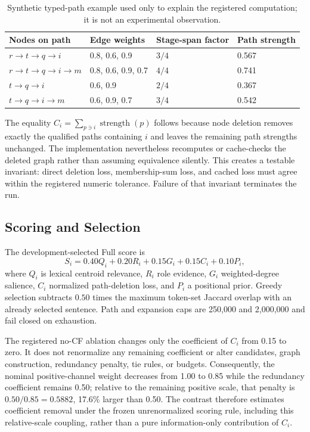 \documentclass[applsci,article,submit,moreauthors]{Definitions/mdpi}
\begin{document}
\begin{table}[H]
\caption{Synthetic typed-path example used only to explain the registered computation; it is not an experimental observation.}
\label{tab:toy-path}\centering\small
\begin{tabular}{llll}
\toprule
Nodes on path & Edge weights & Stage-span factor & Path strength\\
\midrule
$r\rightarrow t\rightarrow q\rightarrow i$ & 0.8, 0.6, 0.9 & $3/4$ & 0.567\\
$r\rightarrow t\rightarrow q\rightarrow i\rightarrow m$ & 0.8, 0.6, 0.9, 0.7 & $4/4$ & 0.741\\
$t\rightarrow q\rightarrow i$ & 0.6, 0.9 & $2/4$ & 0.367\\
$t\rightarrow q\rightarrow i\rightarrow m$ & 0.6, 0.9, 0.7 & $3/4$ & 0.542\\
\bottomrule
\end{tabular}
\end{table}

The equality $C_i=\sum_{p\ni i}\operatorname{strength}(p)$ follows because node deletion removes exactly the qualified paths containing $i$ and leaves the remaining path strengths unchanged. The implementation nevertheless recomputes or cache-checks the deleted graph rather than assuming equivalence silently. This creates a testable invariant: direct deletion loss, membership-sum loss, and cached loss must agree within the registered numeric tolerance. Failure of that invariant terminates the run.

\subsection{Scoring and Selection}

The development-selected Full score is
\begin{equation}
S_i=0.40Q_i+0.20R_i+0.15G_i+0.15C_i+0.10P_i,
\end{equation}
where $Q_i$ is lexical centroid relevance, $R_i$ role evidence, $G_i$ weighted-degree salience, $C_i$ normalized path-deletion loss, and $P_i$ a positional prior. Greedy selection subtracts $0.50$ times the maximum token-set Jaccard overlap with an already selected sentence. Path and expansion caps are 250,000 and 2,000,000 and fail closed on exhaustion.

The registered no-CF ablation changes only the coefficient of $C_i$ from 0.15 to zero. It does not renormalize any remaining coefficient or alter candidates, graph construction, redundancy penalty, tie rules, or budgets. Consequently, the nominal positive-channel weight decreases from 1.00 to 0.85 while the redundancy coefficient remains 0.50; relative to the remaining positive scale, that penalty is $0.50/0.85=0.5882$, 17.6\% larger than 0.50. The contrast therefore estimates coefficient removal under the frozen unrenormalized scoring rule, including this relative-scale coupling, rather than a pure information-only contribution of $C_i$.
\end{document}
